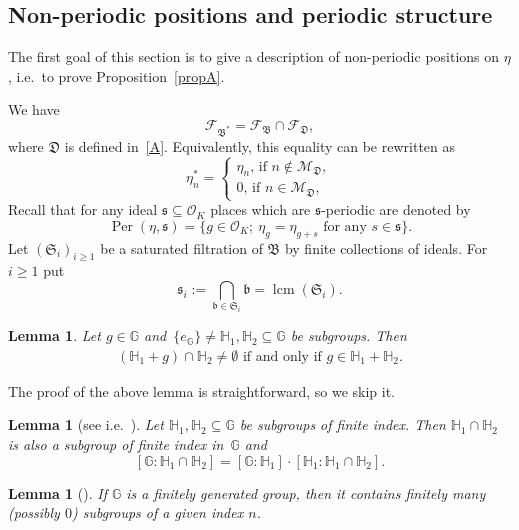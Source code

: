 \documentclass[leqno,a4paper,12pt]{article}
\DeclareMathOperator{\lcm}{lcm}
\newtheorem{Lemma}[Th]{Lemma}
\theoremstyle{definition}
\newcommand{\Per}{\operatorname{Per}\nolimits}
\newcommand{\OK}{\mathcal{O}_K}
\newcommand{\G}{\mathbb{G}}
\newcommand{\HH}{{\mathbb{H}}}
\begin{document}
\subsection{Non-periodic positions and periodic structure}
The first goal of this section is to give a description of non-periodic positions on $\eta$, i.e.\ to prove Proposition~\ref{propA}.

We have
\[
\mathcal{F}_{\mathfrak{B}^*}=\mathcal{F}_\mathfrak{B}\cap \mathcal{F}_\mathfrak{D},
\]
where $\mathfrak{D}$ is defined in~\eqref{A}. Equivalently, this equality can be rewritten as
\begin{equation}\label{eta*}
\eta^*_n=\begin{cases}
\eta_n \text{, if }n\not\in\mathcal{M}_{\mathfrak{D}},\\
0 \text{, if }n\in\mathcal{M}_\mathfrak{D},
\end{cases}
\end{equation}
Recall that for any ideal $\mathfrak{s}\subseteq\OK$ places which are $\mathfrak{s}$-periodic are denoted by
\[\Per(\eta,\mathfrak{s})=\{g\in\OK;\ \eta_g=\eta_{g+s}\text{ for any }s\in\mathfrak{s}\}.\]
Let $(\mathfrak{S}_i)_{i\geq1}$ be a saturated filtration of $\mathfrak{B}$ by finite collections of ideals. For $i\geq1$ put
\[
\mathfrak{s}_i:=\bigcap_{\mathfrak{b}\in\mathfrak{S}_i}\mathfrak{b}=\lcm(\mathfrak{S}_i).
\]
\begin{Lemma}\label{ideal_sol}
Let $g\in\G$ and~$\{e_\G\}\neq\HH_1,\HH_2\subseteq\G$ be subgroups. Then
\begin{align}\label{kogruencja}
(\HH_1+g)\cap\HH_2\neq\emptyset\text{ if and only if }g\in\HH_1+\HH_2.
\end{align}
\end{Lemma}
The proof of the above lemma is straightforward, so we skip it.
%
\begin{Lemma}[see i.e.\ {\cite[Chapter I, Proposition 2.2]{MR1878556}}]\label{intersect}
Let $\HH_1,\HH_2\subseteq\G$ be subgroups of finite index. Then $\HH_1\cap\HH_2$ is also a subgroup of finite index in~$\G$ and \[[\G : \HH_1\cap\HH_2]=[\G : \HH_1]\cdot[\HH_1 : \HH_1\cap\HH_2].\]
\end{Lemma}
\begin{Lemma}[{\cite[2.4. s. 128]{MR36767}}]\label{index}
If $\G$ is a finitely generated group, then it contains finitely many (possibly $0$) subgroups of a given index $n$.
\end{Lemma}
\end{document}

